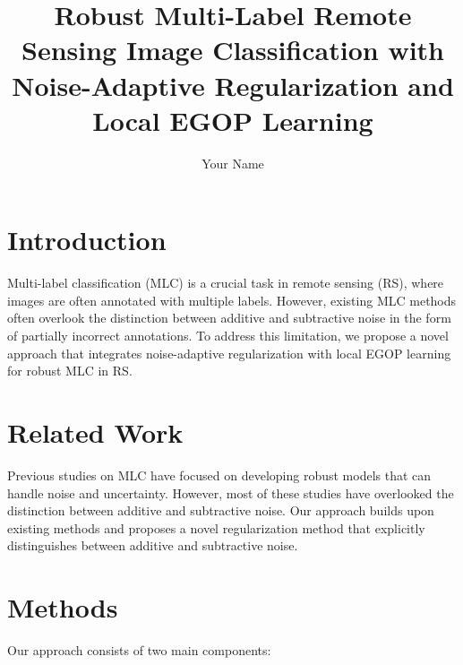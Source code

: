 \documentclass{article}
\begin{document}
\title{Robust Multi-Label Remote Sensing Image Classification with Noise-Adaptive Regularization and Local EGOP Learning}

\author{Your Name}

\maketitle


\section{Introduction}

Multi-label classification (MLC) is a crucial task in remote sensing (RS), where images are often annotated with multiple labels. However, existing MLC methods often overlook the distinction between additive and subtractive noise in the form of partially incorrect annotations. To address this limitation, we propose a novel approach that integrates noise-adaptive regularization with local EGOP learning for robust MLC in RS.

\section{Related Work}

Previous studies on MLC have focused on developing robust models that can handle noise and uncertainty. However, most of these studies have overlooked the distinction between additive and subtractive noise. Our approach builds upon existing methods and proposes a novel regularization method that explicitly distinguishes between additive and subtractive noise.

\section{Methods}

Our approach consists of two main components:
\end{document}

